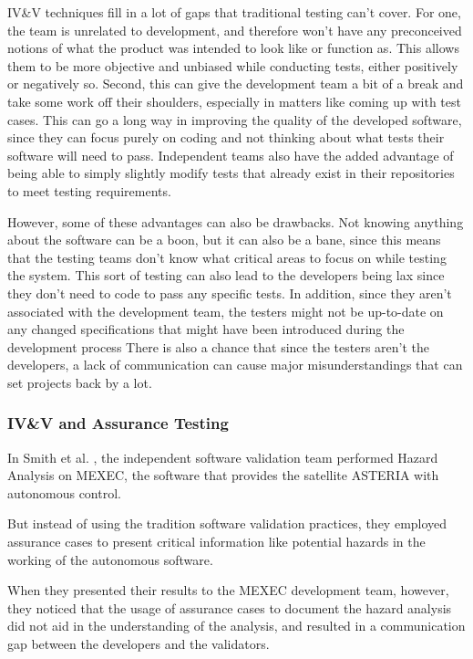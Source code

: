 \documentclass[journal, onecolumn]{IEEEtran}
\begin{document}
	IV\&V techniques fill in a lot of gaps that traditional testing can’t cover. For one, the team is unrelated to development, and therefore won’t have any preconceived notions of what the product was intended to look like or function as. This allows them to be more objective and unbiased while conducting tests, either positively or negatively so. Second, this can give the development team a bit of a break and take some work off their shoulders, especially in matters like coming up with test cases. This can go a long way in improving the quality of the developed software, since they can focus purely on coding and not thinking about what tests their software will need to pass. Independent teams also have the added advantage of being able to simply slightly modify tests that already exist in their repositories to meet testing requirements.
	
	\bigskip
	
	However, some of these advantages can also be drawbacks. Not knowing anything about the software can be a boon, but it can also be a bane, since this means that the testing teams don’t know what critical areas to focus on while testing the system. This sort of testing can also lead to the developers being lax since they don’t need to code to pass any specific tests. In addition, since they aren’t associated with the development team, the testers might not be up-to-date on any changed specifications that might have been introduced during the development process There is also a chance that since the testers aren’t the developers, a lack of communication can cause major misunderstandings that can set projects back by a lot. 
	
	\bigskip
	
	\subsubsection{IV\&V and Assurance Testing}
	
	In Smith et al. \cite{hazard}, the independent software validation team performed Hazard Analysis on MEXEC, the software that provides the satellite ASTERIA with autonomous control. 
	
	But instead of using the tradition software validation practices, they employed assurance cases to present critical information like potential hazards in the working of the autonomous software. 
	
	When they presented their results to the MEXEC development team, however, they noticed that the usage of assurance cases to document the hazard analysis did not aid in the understanding of the analysis, and resulted in a communication gap between the developers and the validators. 
	
\end{document}
